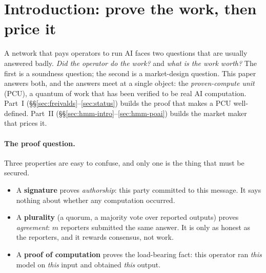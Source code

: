 \documentclass[11pt]{article}
\begin{document}
\begin{abstract}
We state plainly what is live: the verifier core, the typed graph-composition, and
the determinism prerequisites ship and are tested in Rust and Go; the chain
enforces no-proof-no-mint; end-to-end proof \emph{emission} from a running model is
designed and merged but not yet live. The HMM is a protocol-design contribution:
every claim is a theorem with a proof, and we report no empirical benchmark we did
not measure.
\end{abstract}

\tableofcontents

\section{Introduction: prove the work, then price it}
\label{sec:intro}

A network that pays operators to run AI faces two questions that are usually
answered badly. \emph{Did the operator do the work?} and \emph{what is the work
worth?} The first is a soundness question; the second is a market-design question.
This paper answers both, and the answers meet at a single object: the
\emph{proven-compute unit} (PCU), a quantum of work that has been verified to be
real AI computation. Part~I (\S\S\ref{sec:freivalds}--\ref{sec:status}) builds the
proof that makes a PCU well-defined. Part~II
(\S\S\ref{sec:hmm-intro}--\ref{sec:hmm-poai}) builds the market maker that prices
it.

\paragraph{The proof question.} Three properties are easy to confuse, and only one
is the thing that must be secured.

\begin{itemize}[leftmargin=1.4em]
  \item A \textbf{signature} proves \emph{authorship}: this party committed to
        this message. It says nothing about whether any computation occurred.
  \item A \textbf{plurality} (a quorum, a majority vote over reported outputs)
        proves \emph{agreement}: $m$ reporters submitted the same answer. It is
        only as honest as the reporters, and it rewards consensus, not work.
  \item A \textbf{proof of computation} proves the load-bearing fact: this
        operator ran \emph{this} model on \emph{this} input and obtained
        \emph{this} output.
\end{itemize}
\end{document}
